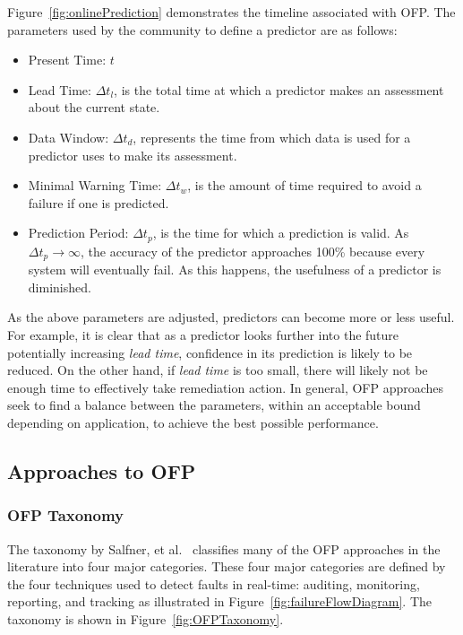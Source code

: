 Figure~\ref{fig:onlinePrediction} demonstrates the timeline associated with
\ac{OFP}.  The parameters used by the community to define a predictor are as
follows:
\begin{itemize}
	\item{Present Time: $t$}
  \item{Lead Time: $\Delta t_{l}$, is the total time at which a predictor makes
  an assessment about the current state.}
  \item{Data Window: $\Delta t_{d}$, represents the time from which data is
  used for a predictor uses to make its assessment.}
  \item{Minimal Warning Time: $\Delta t_{w}$, is the amount of time required to
  avoid a failure if one is predicted.}
  \item{Prediction Period: $\Delta t_{p}$, is the time for which a prediction
  is valid.  As $\Delta t_{p} \rightarrow \infty$, the accuracy of the
  predictor approaches 100\% because every system will eventually fail.  As
  this happens, the usefulness of a predictor is diminished.}
\end{itemize}

As the above parameters are adjusted, predictors can become more or less
useful.  For example, it is clear that as a predictor looks further into the
future potentially increasing \emph{lead time}, confidence in its prediction is
likely to be reduced.  On the other hand, if \emph{lead time} is too small,
there will likely not be enough time to effectively take remediation action.
In general, \ac{OFP} approaches seek to find a balance between the parameters,
within an acceptable bound depending on application, to achieve the best
possible performance.

\subsection{Approaches to \ac{OFP}} \label{approaches}
\subsubsection{\ac{OFP} Taxonomy}
The taxonomy by Salfner, et al.~\cite{salfnerSurvey} classifies many of the
\ac{OFP} approaches in the literature into four major categories.  These four
major categories are defined by the four techniques used to detect faults in
real-time: auditing, monitoring, reporting, and tracking as illustrated in
Figure~\ref{fig:failureFlowDiagram}.  The taxonomy is shown in
Figure~\ref{fig:OFPTaxonomy}.


